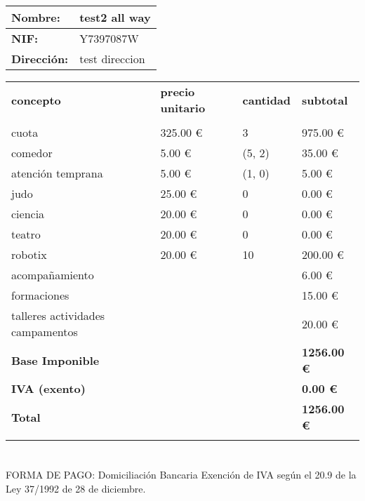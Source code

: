 \documentclass{article}%
\begin{document}
%
\normalsize%
\vspace*{8ex}%
\renewcommand{\arraystretch}{1.2}%
\begin{tabular}{l|l}%
\textbf{Nombre:}&test2 all way\\%
\hline%
\textbf{NIF:}&Y7397087W\\%
\hline%
\textbf{Dirección:}&test direccion\\%
\hline%
\end{tabular}%
\vspace*{8ex}%
\renewcommand{\arraystretch}{1.5}%
\begin{longtabu}{X[3l] X[c] X[c] X[c]}%
%
\textbf{concepto}&\textbf{precio unitario}&\textbf{cantidad}&\textbf{subtotal}\\%
&&&\\%
\hline%
cuota&325.00 €&3&975.00 €\\%
\hline%
comedor&5.00 €&(5, 2)&35.00 €\\%
\hline%
atención temprana&5.00 €&(1, 0)&5.00 €\\%
\hline%
judo&25.00 €&0&0.00 €\\%
\hline%
ciencia&20.00 €&0&0.00 €\\%
\hline%
teatro&20.00 €&0&0.00 €\\%
\hline%
robotix&20.00 €&10&200.00 €\\%
\hline%
acompañamiento&&&6.00 €\\%
\hline%
formaciones&&&15.00 €\\%
\hline%
talleres actividades campamentos&&&20.00 €\\%
\hline%
\textbf{Base Imponible}&&&\textbf{1256.00 €}\\%
\hline%
\textbf{IVA (exento)}&&&\textbf{0.00 €}\\%
\hline%
\textbf{Total}&&&\textbf{1256.00 €}\\%
\vspace*{10ex}%
\end{longtabu}%
\section*{}%
\label{sec:}%
FORMA DE PAGO: Domiciliación Bancaria\newline%
%
Exención de IVA según el 20.9 de la Ley 37/1992 de 28 de diciembre.

%
\pagestyle{firstpage}%
\end{document}
